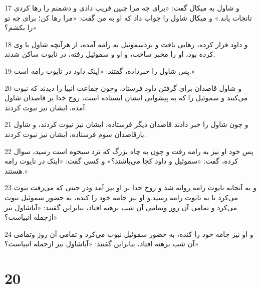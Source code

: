 \par 17 و شاول به میکال گفت: «برای چه مرا چنین فریب دادی و دشمنم را رها کردی تانجات یابد.» و میکال شاول را جواب داد که او به من گفت: «مرا رها کن؛ برای چه تو را بکشم؟»
\par 18 و داود فرار کرده، رهایی یافت و نزدسموئیل به رامه آمده، از هر‌آنچه شاول با وی کرده بود، او را مخبر ساخت، و او و سموئیل رفته، در نایوت ساکن شدند.
\par 19 پس شاول را خبرداده، گفتند: «اینک داود در نایوت رامه است.»
\par 20 و شاول قاصدان برای گرفتن داود فرستاد، وچون جماعت انبیا را دیدند که نبوت می‌کنند و سموئیل را که به پیشوایی ایشان ایستاده است، روح خدا بر قاصدان شاول آمده، ایشان نیز نبوت کردند.
\par 21 و چون شاول را خبر دادند قاصدان دیگر فرستاده، ایشان نیز نبوت کردند، و شاول بازقاصدان سوم فرستاده، ایشان نیز نبوت کردند.
\par 22 پس خود او نیز به رامه رفت و چون به چاه بزرگ که نزد سیخوه است رسید، سوال کرده، گفت: «سموئیل و داود کجا می‌باشند؟» و کسی گفت: «اینک در نایوت رامه هستند.»
\par 23 و به آنجابه نایوت رامه روانه شد و روح خدا بر او نیز آمد ودر حینی که می‌رفت نبوت می‌کرد تا به نایوت رامه رسید.و او نیز جامه خود را کنده، به حضور سموئیل نبوت می‌کرد و تمامی آن روز وتمامی آن شب برهنه افتاد، بنابراین گفتند: «آیاشاول نیز از‌جمله انبیاست؟»
\par 24 و او نیز جامه خود را کنده، به حضور سموئیل نبوت می‌کرد و تمامی آن روز وتمامی آن شب برهنه افتاد، بنابراین گفتند: «آیاشاول نیز از‌جمله انبیاست؟» 
 
\chapter{20}

